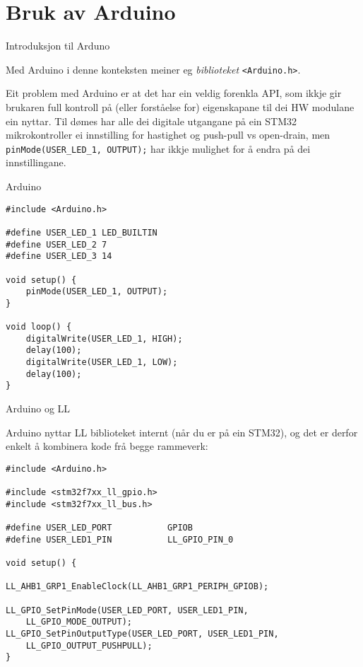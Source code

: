 \section{Bruk av Arduino}

\begin{frame}{Introduksjon til Arduno}
	
	Med Arduino i denne konteksten meiner eg \textit{biblioteket} \texttt{<Arduino.h>}.
	
	Eit problem med Arduino er at det har ein veldig forenkla API, som ikkje gir brukaren full kontroll på (eller forståelse for) eigenskapane til dei HW modulane ein nyttar. Til dømes har alle dei digitale utgangane på ein STM32 mikrokontroller ei innstilling for hastighet og push-pull vs open-drain, men \texttt{pinMode(USER_LED_1, OUTPUT);} har ikkje mulighet for å endra på dei innstillingane.
	
\end{frame}

\begin{frame}[containsverbatim]{Arduino}
	
	\begin{verbatim}
#include <Arduino.h>

#define USER_LED_1 LED_BUILTIN
#define USER_LED_2 7
#define USER_LED_3 14

void setup() {
	pinMode(USER_LED_1, OUTPUT);
}

void loop() {
	digitalWrite(USER_LED_1, HIGH);
	delay(100);
	digitalWrite(USER_LED_1, LOW);
	delay(100);
}
	\end{verbatim}
	
\end{frame}


\begin{frame}[containsverbatim]{Arduino og LL}
	
Arduino nyttar LL biblioteket internt (når du er på ein STM32), og det er derfor enkelt å kombinera kode frå begge rammeverk:
	
	\begin{verbatim}
#include <Arduino.h>

#include <stm32f7xx_ll_gpio.h>
#include <stm32f7xx_ll_bus.h>

#define USER_LED_PORT           GPIOB
#define USER_LED1_PIN           LL_GPIO_PIN_0

void setup() {
	
LL_AHB1_GRP1_EnableClock(LL_AHB1_GRP1_PERIPH_GPIOB);
	
LL_GPIO_SetPinMode(USER_LED_PORT, USER_LED1_PIN,
	LL_GPIO_MODE_OUTPUT);
LL_GPIO_SetPinOutputType(USER_LED_PORT, USER_LED1_PIN,
	LL_GPIO_OUTPUT_PUSHPULL);
}
	\end{verbatim}
	
\end{frame}

